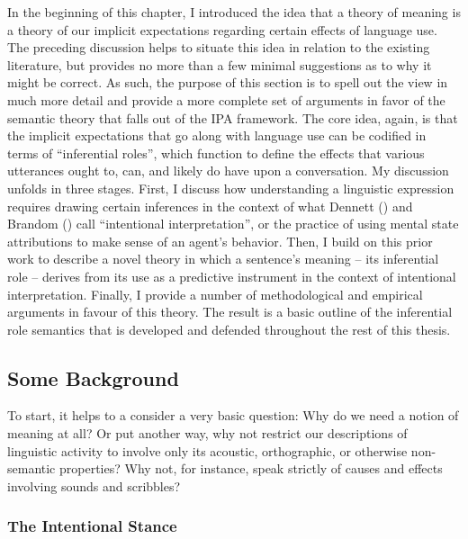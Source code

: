 In the beginning of this chapter, I introduced the idea that a theory of meaning is a theory of our implicit expectations regarding certain effects of language use. The preceding discussion helps to situate this idea in relation to the existing literature, but provides no more than a few minimal suggestions as to why it might be correct. As such, the purpose of this section is to spell out the view in much more detail and provide a more complete set of arguments in favor of the semantic theory that falls out of the IPA framework. The core idea, again, is that the implicit expectations that go along with language use can be codified in terms of ``inferential roles'', which function to define the effects that various utterances ought to, can, and likely do have upon a conversation. My discussion unfolds in three stages. First, I discuss how understanding a linguistic expression requires drawing certain inferences in the context of what Dennett (\citeyear{Dennett:1991,Dennett:1987}) and Brandom  (\citeyear{Brandom:1994,Brandom:2000,Brandom:2009}) call ``intentional interpretation'', or the practice of using mental state attributions to make sense of an agent's behavior. Then, I build on this prior work to describe a novel theory in which a sentence's meaning -- its inferential role -- derives from its use as a predictive instrument in the context of intentional interpretation. Finally, I provide a number of methodological and empirical arguments in favour of this theory. The result is a basic outline of the inferential role semantics that is developed and defended throughout the rest of this thesis. 

\subsection{Some Background}

To start, it helps to a consider a very basic question: Why do we need a notion of meaning at all? Or put another way, why not restrict our descriptions of linguistic activity to involve only its acoustic, orthographic, or otherwise non-semantic properties? Why not, for instance, speak strictly of causes and effects involving sounds and scribbles?

\subsubsection{The Intentional Stance}

